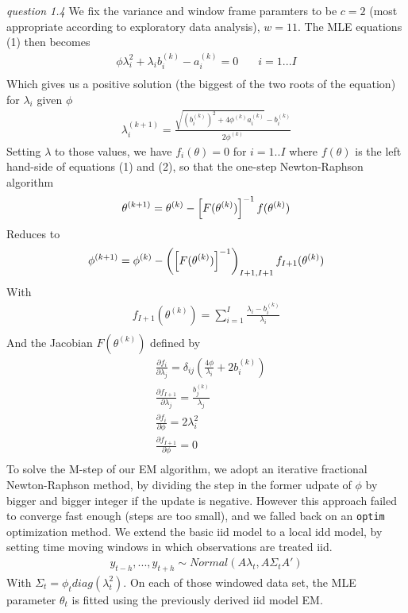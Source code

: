 \documentclass[twoside]{article}
\begin{document}
\textit{question 1.4} We fix the variance and window frame paramters to be $c = 2$ (most appropriate according to exploratory data analysis), $w=11$. The MLE equations (1) then becomes
\begin{align*}
\phi \lambda_i^{2} + \lambda_i b_i^{(k)} - a_i^{(k)} = 0 &  \quad i = 1...I \\
\end{align*}
Which gives us a positive solution (the biggest of the two roots of the equation) for $\lambda_i$ given $\phi$
\begin{align*}
\lambda^{(k + 1)}_i = \frac{\sqrt{(b_i^{(k)})^2 + 4 \phi^{(k)} a_i^{(k)}} - b_i^{(k)}}{2 \phi^{(k)}}
\end{align*}
Setting $\lambda$ to those values, we have $f_i(\theta) = 0$ for $i = 1..I$ where $f(\theta)$ is the left hand-side of equations (1) and (2), so that the one-step Newton-Raphson algorithm
\begin{align*}
\theta^{(k + 1)} = \theta^{(k)} - \left[ F ( \theta^{(k)} ) \right]^{-1} \* f(\theta^{(k)})
\end{align*}
Reduces to
\begin{align*}
\phi^{(k + 1)} = \phi^{(k)} - \left(\left[ F ( \theta^{(k)} ) \right]^{-1}\right)_{I + 1, I + 1} \* f_{I + 1}(\theta^{(k)})
\end{align*}
With
\begin{align*}
f_{I + 1}(\theta^{(k)}) = \sum_{i = 1}^I \frac{\lambda_i - b_i^{(k)}}{\lambda_i}\\
\end{align*}
And the Jacobian $F ( \theta^{(k)})$ defined by
\begin{align*}
& \frac{\partial f_i}{\partial \lambda_j} = \delta_{i j} \left( \frac{4 \phi}{\lambda_i} + 2 b_i^{(k)} \right)\\
& \frac{\partial f_{I + 1}}{\partial \lambda_j} = \frac{b_j^{(k)}}{\lambda_j}\\
& \frac{\partial f_i}{\partial \phi} = 2 \lambda_i^2\\
& \frac{\partial f_{I + 1}}{\partial \phi} = 0\\
\end{align*}
To solve the M-step of our EM algorithm, we adopt an iterative fractional Newton-Raphson method, by dividing the step in the former udpate of $\phi$ by bigger and bigger integer if the update is negative. However this approach failed to converge fast enough (steps are too small), and we falled back on an \texttt{optim} optimization method.
\vspace{.2 in}
We extend the basic iid model to a local idd model, by setting time moving windows in which observations are treated iid.
\begin{align*}
y_{t - h}, ..., y_{t + h} \sim Normal(A \lambda_t, A \Sigma_t A' )
\end{align*}
With $\Sigma_t = \phi_t diag(\lambda_t^2)$. On each of those windowed data set, the MLE parameter $\theta_t$ is fitted using the previously derived iid model EM.
\end{document}
